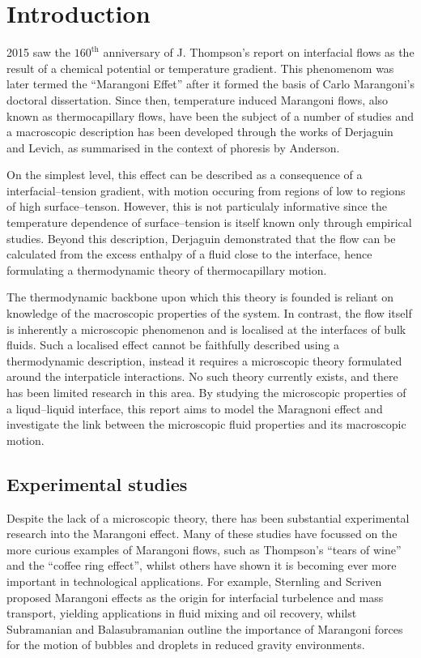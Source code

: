 \section{Introduction}
2015 saw the $160^{\mathrm{th}}$ anniversary of J. Thompson's report on interfacial flows as the result of a chemical potential or temperature gradient.\cite{JThompson}
This phenomenom was later termed the ``Marangoni Effet'' after it formed the basis of Carlo Marangoni's doctoral dissertation.\cite{Marangoni}
Since then, temperature induced Marangoni flows, also known as thermocapillary flows, have been the subject of a number of studies and a macroscopic description has been developed through the works of Derjaguin\cite{SurfaceForces} and Levich\cite{Levich}, as summarised in the context of phoresis by Anderson\cite{Anderson}.

On the simplest level, this effect can be described as a consequence of a interfacial--tension gradient, with motion occuring from regions of low to regions of high surface--tenson.
However, this is not particulaly informative since the temperature dependence of surface--tension is itself known only through empirical studies.
Beyond this description, Derjaguin demonstrated that the flow can be calculated from the excess enthalpy of a fluid close to the interface, hence formulating a thermodynamic theory of thermocapillary motion.\cite{SurfaceForces}

The thermodynamic backbone upon which this theory is founded is reliant on knowledge of the macroscopic properties of the system.
In contrast, the flow itself is inherently a microscopic phenomenon and is localised at the interfaces of bulk fluids. 
Such a localised effect cannot be faithfully described using a thermodynamic description, instead it requires a microscopic theory formulated around the interpaticle interactions. 
No such theory currently exists, and there has been limited research in this area.\cite{HolgerBoppHampe}
By studying the microscopic properties of a liqud--liquid interface, this report aims to model the Maragnoni effect and investigate the link between the microscopic fluid properties and its macroscopic motion.

\subsection{Experimental studies}
Despite the lack of a microscopic theory, there has been substantial experimental research into the Marangoni effect.
Many of these studies have focussed on the more curious examples of Marangoni flows, such as Thompson's ``tears of wine''\cite{JThompson,Venerus,Tadmor,Cazabat1995} and the ``coffee ring effect'',\cite{Sefian,HuLarson,Sefiane2014} whilst others have shown it is becoming ever more important in technological applications.
For example, Sternling and Scriven\cite{SternlingScriven} proposed Marangoni effects as the origin for interfacial turbelence and mass transport, yielding applications in fluid mixing and oil recovery,\cite{Aguilera2005,LyfordA,LyfordB} whilst Subramanian and Balasubramanian outline the importance of Marangoni forces for the motion of bubbles and droplets in reduced gravity environments.\cite{MotionOfBubblesAndDrops} 

